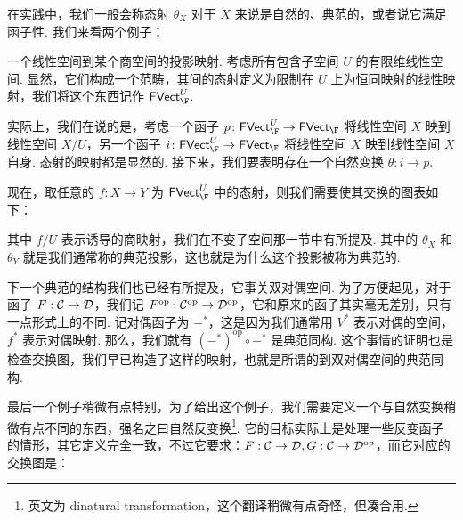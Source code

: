 在实践中，我们一般会称态射 $\theta_X$ 对于 $X$ 来说是自然的、典范的，或者说它满足函子性. 我们来看两个例子：

\begin{example}{}{}
    一个线性空间到某个商空间的投影映射. 考虑所有包含子空间 $U$ 的有限维线性空间. 显然，它们构成一个范畴，其间的态射定义为限制在 $U$ 上为恒同映射的线性映射，我们将这个东西记作 $\FVect_\F^U$.

    实际上，我们在说的是，考虑一个函子 $p\colon \FVect_\F^U \to \FVect_\F$ 将线性空间 $X$ 映到线性空间 $X/U$，另一个函子 $i\colon \FVect_\F^U \to \FVect_\F$ 将线性空间 $X$ 映到线性空间 $X$ 自身. 态射的映射都是显然的. 接下来，我们要表明存在一个自然变换 $\theta: i \to p$.

    现在，取任意的 $f\colon X \to Y$ 为 $\FVect_\F^U$ 中的态射，则我们需要使其交换的图表如下：

    \begin{center}
    \end{center}

    其中 $f/U$ 表示诱导的商映射，我们在不变子空间那一节中有所提及. 其中的 $\theta_X$ 和 $\theta_Y$ 就是我们通常称的典范投影，这也就是为什么这个投影被称为典范的.
\end{example}

下一个典范的结构我们也已经有所提及，它事关双对偶空间. 为了方便起见，对于函子 $F: \mathcal{C} \to \mathcal{D}$，我们记 $F^\mathrm{op}: \mathcal{C}^\mathrm{op} \to \mathcal{D}^\mathrm{op}$，它和原来的函子其实毫无差别，只有一点形式上的不同. 记对偶函子为 $-^*$，这是因为我们通常用 $V^*$ 表示对偶的空间，$f^*$ 表示对偶映射. 那么，我们就有 $(-^*)^\mathrm{op} \circ -^*$ 是典范同构. 这个事情的证明也是检查交换图，我们早已构造了这样的映射，也就是所谓的到双对偶空间的典范同构.

最后一个例子稍微有点特别，为了给出这个例子，我们需要定义一个与自然变换稍微有点不同的东西，强名之曰自然反变换\footnote{英文为 dinatural transformation，这个翻译稍微有点奇怪，但凑合用. }. 它的目标实际上是处理一些反变函子的情形，其它定义完全一致，不过它要求：$F: \mathcal{C} \to \mathcal{D}, G: \mathcal{C} \to \mathcal{D}^\mathrm{op}$，而它对应的交换图是：

\begin{center}
\end{center}

